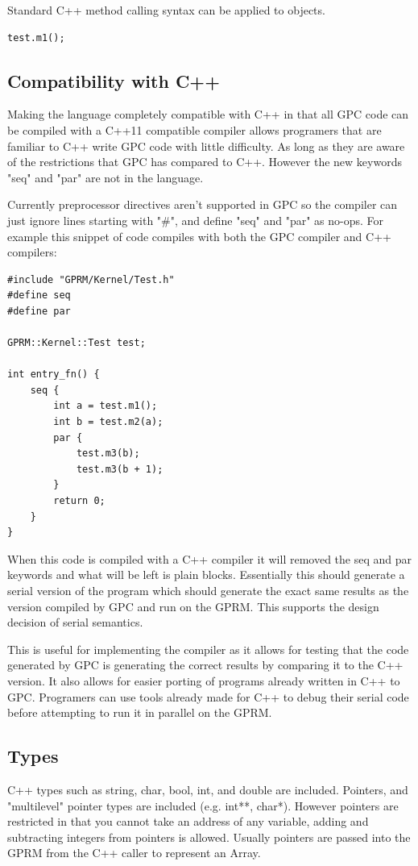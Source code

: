 Standard C++ method calling syntax can be applied to objects.
\begin{lstlisting}[style=myGPC]
test.m1();
\end{lstlisting}



\subsection{Compatibility with C++}
Making the language completely compatible with C++ in that all GPC code can be
compiled with a C++11 compatible compiler allows programers that are familiar to
C++ write GPC code with little difficulty. As long as they are aware of the restrictions
that GPC has compared to C++. However the new keywords "seq" and "par" are not in the language.

Currently preprocessor directives aren't supported in GPC so the compiler can
just ignore lines starting with "\#", and define "seq" and "par" as no-ops. 
For example this snippet of code compiles with both the GPC compiler and 
C++ compilers:

\begin{lstlisting}[style=myGPC]
#include "GPRM/Kernel/Test.h"
#define seq
#define par

GPRM::Kernel::Test test;

int entry_fn() {
    seq {
        int a = test.m1();
        int b = test.m2(a);        
        par {
            test.m3(b);
            test.m3(b + 1);
        }
        return 0;
    }
}
\end{lstlisting}

When this code is compiled with a C++ compiler it will removed the seq and par
keywords and what will be left is plain blocks. Essentially this should generate a
serial version of the program which should generate the exact same results
as the version compiled by GPC and run on the GPRM. This supports the 
design decision of serial semantics.

This is useful for implementing the compiler as it allows for
testing that the code generated by GPC is generating the correct results
by comparing it to the C++ version. It also allows for easier porting of
programs already written in C++ to GPC. Programers can use tools
already made for C++ to debug their serial code before attempting
to run it in parallel on the GPRM.

\subsection{Types}
        C++ types such as string, char, bool, int, and double are included.
        Pointers, and "multilevel" pointer types are included (e.g. int**, char*).
        However pointers are restricted in that you cannot take
        an address of any variable, adding and subtracting integers
        from pointers is allowed. Usually pointers are passed into
        the GPRM from the C++ caller to represent an Array.

